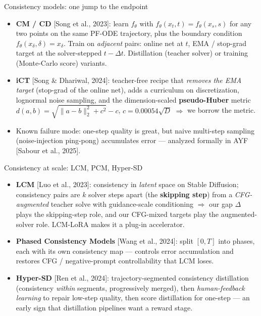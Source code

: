 \documentclass[aspectratio=169,10pt]{beamer}
\newcommand{\litref}[1]{{\scriptsize\color{black!55}[#1]}}
\begin{document}
\begin{frame}{Consistency models: one jump to the endpoint}
  \begin{itemize}
    \item \textbf{CM / CD} \litref{Song et al., 2023}: learn $f_\theta$ with
      $f_\theta(x_t, t) = f_\theta(x_s, s)$ for any two points on the same
      PF-ODE trajectory, plus the boundary condition
      $f_\theta(x_\delta, \delta) = x_\delta$. Train on \emph{adjacent} pairs:
      online net at $t$, EMA / stop-grad target at the solver-stepped
      $t - \Delta t$. Distillation (teacher solver) or training (Monte-Carlo
      score) variants.
    \item \textbf{iCT} \litref{Song \& Dhariwal, 2024}: teacher-free recipe
      that \emph{removes the EMA target} (stop-grad of the online net),
      adds a curriculum on discretization, lognormal noise sampling, and the
      dimension-scaled \textbf{pseudo-Huber} metric
      $d(a,b) = \sqrt{\lVert a-b \rVert_2^2 + c^2} - c$,
      $c = 0.00054\sqrt{D}$ $\Rightarrow$ \alert{we borrow the metric}.
    \item Known failure mode: one-step quality is great, but naive multi-step
      sampling (noise-injection ping-pong) accumulates error --- analyzed
      formally in AYF \litref{Sabour et al., 2025}.
  \end{itemize}
\end{frame}

\begin{frame}{Consistency at scale: LCM, PCM, Hyper-SD}
  \begin{itemize}
    \item \textbf{LCM} \litref{Luo et al., 2023}: consistency in \emph{latent}
      space on Stable Diffusion; consistency pairs are $k$ solver steps apart
      (the \textbf{skipping step}) from a \emph{CFG-augmented} teacher solve
      with guidance-scale conditioning $\Rightarrow$ \alert{our gap $\Delta$
      plays the skipping-step role}, and our CFG-mixed targets play the
      augmented-solver role. LCM-LoRA makes it a plug-in accelerator.
    \item \textbf{Phased Consistency Models} \litref{Wang et al., 2024}:
      split $[0,T]$ into phases, each with its own consistency map ---
      controls error accumulation and restores CFG / negative-prompt
      controllability that LCM loses.
    \item \textbf{Hyper-SD} \litref{Ren et al., 2024}: trajectory-segmented
      consistency distillation (consistency \emph{within} segments,
      progressively merged), then \emph{human-feedback learning} to repair
      low-step quality, then score distillation for one-step --- an early
      sign that \alert{distillation pipelines want a reward stage}.
  \end{itemize}
\end{frame}
\end{document}
